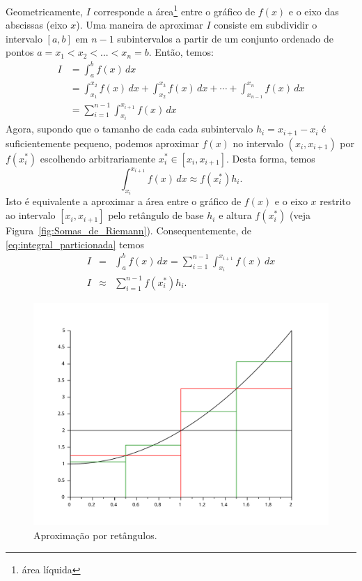 Geometricamente, $I$ corresponde a área\footnote{área líquida} entre o gráfico de $f(x)$ e o eixo das abscissas (eixo $x$). Uma maneira de aproximar $I$ consiste em subdividir o intervalo $[a,b]$ em $n-1$ subintervalos a partir de um conjunto ordenado de pontos $a=x_1<x_2<...<x_n=b$. Então, temos:
\begin{equation}\label{eq:integral_particionada}
  \begin{split}
    I &= \int_a^b f(x)\,dx\\
    &= \int_{x_1}^{x_2}f(x)\,dx + \int_{x_2}^{x_3}f(x)\,dx + \cdots + \int_{x_{n-1}}^{x_{n}}f(x)\,dx\\
    &= \sum_{i=1}^{n-1}\int_{x_i}^{x_{i+1}}f(x)\,dx
  \end{split}
\end{equation}
Agora, supondo que o tamanho de cada cada subintervalo $h_i = x_{i+1}-x_{i}$ é suficientemente pequeno, podemos aproximar $f(x)$ no intervalo $(x_i, x_{i+1})$ por $f(x_i^*)$ escolhendo arbitrariamente $x_i^{*}\in [x_i, x_{i+1}]$. Desta forma, temos
\begin{equation}
  \int_{x_i}^{x_{i+1}}f(x)\,dx \approx f(x_i^*)h_i.
\end{equation}
Isto é equivalente a aproximar a área entre o gráfico de $f(x)$ e o eixo $x$ restrito ao intervalo $[x_i, x_{i+1}]$ pelo retângulo de base $h_i$ e altura $f(x_i^*)$ (veja Figura~\ref{fig:Somas_de_Riemann}). Consequentemente, de \eqref{eq:integral_particionada} temos
\begin{eqnarray}
  I &=& \int_{a}^{b}f(x)\,dx = \sum_{i=1}^{n-1}\int_{x_i}^{x_{i+1}}f(x)\,dx\\
  I &\approx& \sum_{i=1}^{n-1} f(x_i^*)h_i.
\end{eqnarray}

\begin{figure}
  \centering
  \includegraphics[scale=0.7]{./cap_integracao/pics/int_1/int_1}
  \caption{Aproximação por retângulos.}
  \label{fig:int_101}
\end{figure}

